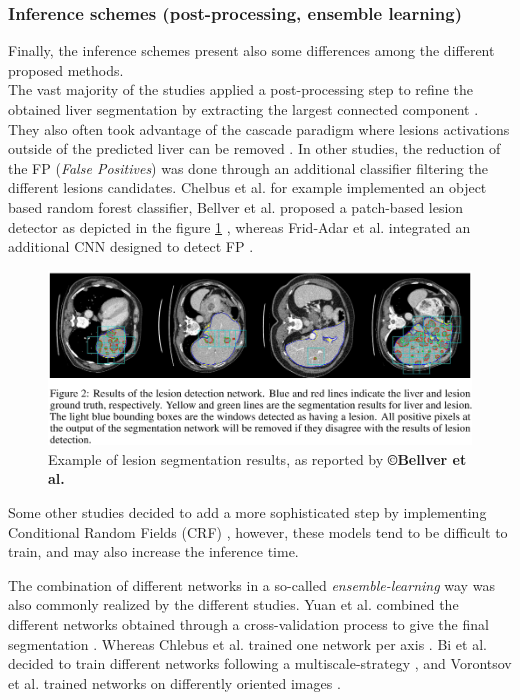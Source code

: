 \subsubsection{Inference schemes (post-processing, ensemble learning)}


Finally, the inference schemes present also some differences among the
different proposed methods. \\
The vast majority of the studies applied a post-processing step to
refine the obtained liver segmentation by extracting the largest
connected component \cite{Li2018, Han2017, Yuan2017, Bellver2017, Kaluva2018}. They
also often took advantage of the cascade paradigm where lesions
activations outside of the predicted liver can be removed \cite{Li2018, Yuan2017, Vorontsov2018}. In other studies, the reduction of the FP
(\emph{False Positives}) was done through an additional classifier
filtering the different lesions candidates. Chelbus et al. \cite{Chlebus2018} for
example implemented an object based random forest classifier,
Bellver et al. proposed a patch-based lesion detector as
depicted in the figure \ref{Bellver_predResults} \cite{Bellver2017}, whereas Frid-Adar et al. integrated an
additional CNN designed to detect FP \cite{Frid-adar2017}.

\begin{figure}[th!]
	\centering
	\includegraphics[width=0.7\linewidth]{images/image25}
	\caption{Example of lesion segmentation results, as reported by \textbf{©Bellver et al. \cite{Bellver2017}}}
	\label{Bellver_predResults}
\end{figure}


Some other studies decided to add a more sophisticated step by
implementing Conditional Random Fields (CRF) \cite{Christ2017, Rafiei2018, Dou2016}, however, these models
tend to be difficult to train, and may also
increase the inference time.

The combination of different networks in a so-called
\emph{ensemble-learning} way was also commonly realized by the different
studies. Yuan et al. combined the different networks obtained
through a cross-validation process to give the final segmentation \cite{Yuan2017}.
Whereas Chlebus et al. trained one network per axis \cite{Chlebus2018}. Bi et al. decided to train different networks following a
multiscale-strategy \cite{Bi2017}, and Vorontsov et al. trained networks on
differently oriented images \cite{Vorontsov2018}.

